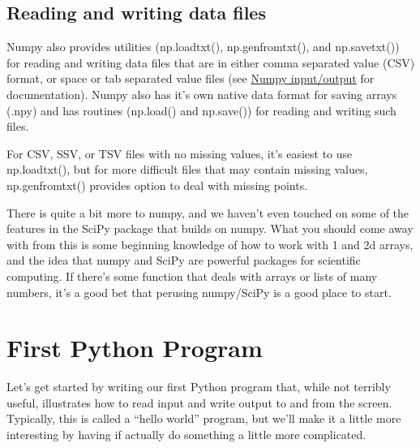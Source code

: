 \subsection{Reading and writing data files}
Numpy also provides utilities (np.loadtxt(), np.genfromtxt(), and np.savetxt()) for reading and writing data files that are in either comma separated value (CSV) format, or space or tab separated value files (see \href{http://docs.scipy.org/doc/numpy/reference/routines.io.html}{Numpy input/output} for documentation). Numpy also has it's own native data format for saving arrays (.npy) and has routines (np.load() and np.save()) for reading and writing such files. 

For CSV, SSV, or TSV files with no missing values, it's easiest to use np.loadtxt(), but for more difficult files that may contain missing values, np.genfromtxt() provides option to deal with missing points. 



There is quite a bit more to numpy, and we haven't even touched on some of the features in the SciPy package that builds on numpy. What you should come away with from this is some beginning
knowledge of how to work with 1 and 2d arrays, and the idea that numpy and SciPy are powerful packages for scientific computing. If there's some function that deals with arrays or lists of many numbers, it's a good bet that perusing numpy/SciPy is a good place to start. 
\section{First Python Program}
\label{sec:FirstProgram}

Let's get started by writing our first Python program that, while not terribly useful, illustrates how to read input and write output to and from the screen. Typically, this is called a ``hello world'' program, but we'll make it a little more interesting by having if actually do something a little more complicated. 

